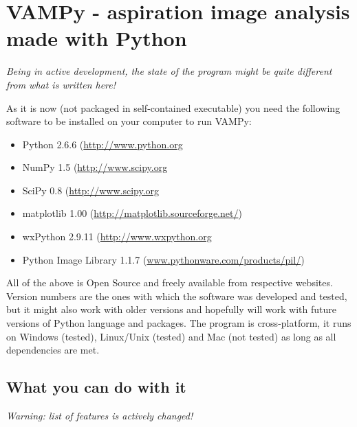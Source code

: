 \section{VAMPy - aspiration image analysis made with Python}\label{vampy}
\emph{Being in active development, the state of the program might be quite different from what is written here!}

As it is now (not packaged in self-contained executable) you need the following software to be installed on your computer to run VAMPy:
\begin{itemize}
	\item Python 2.6.6 (\url{http://www.python.org}
	\item NumPy 1.5 (\url{http://www.scipy.org}
	\item SciPy 0.8 (\url{http://www.scipy.org}
	\item matplotlib 1.00 (\url{http://matplotlib.sourceforge.net/})
	\item wxPython 2.9.11 (\url{http://www.wxpython.org}
	\item Python Image Library 1.1.7 (\url{www.pythonware.com/products/pil/}) 
\end{itemize}
All of the above is Open Source and freely available from respective websites. Version numbers are the ones with which the software was developed and tested, but it might also work with older versions and hopefully will work with future versions of Python language and packages. The program is cross-platform, it runs on Windows (tested), Linux/Unix (tested) and Mac (not tested) as long as all dependencies are met.

\subsection{What you can do with it}\label{vampy-features}
\emph{Warning: list of features is actively changed!}

